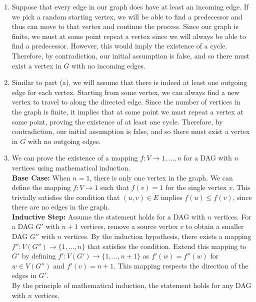 \documentclass{article}
\begin{document}
\begin{solution}
\begin{enumerate}[label = (\alph*)]
    \item Suppose that every edge in our graph does have at least an incoming edge. If we pick a random starting vertex, we will be able to find a predecessor and thus can move to that vertex and continue the process. Since our graph is finite, we must at some point repeat a vertex since we will always be able to find a predecessor. However, this would imply the existence of a cycle. Therefore, by contradiction, our initial assumption is false, and so there must exist a vertex in $G$ with no incoming edges.

    \item Similar to part (a), we will assume that there is indeed at least one outgoing edge for each vertex. Starting from some vertex, we can always find a new vertex to travel to along the directed edge. Since the number of vertices in the graph is finite, it implies that at some point we must repeat a vertex at some point, proving the existence of at least one cycle. Therefore, by contradiction, our initial assumption is false, and so there must exist a vertex in $G$ with no outgoing edges.

    \item We can prove the existence of a mapping $f : V \to {1, \dots, n}$ for a DAG with $n$ vertices using mathematical induction.\\
    
    \textbf{Base Case:} When $n = 1$, there is only one vertex in the graph. We can define the mapping $f : V \to {1}$ such that $f(v) = 1$ for the single vertex $v$. This trivially satisfies the condition that $(u, v) \in E$ implies $f(u) \leq f(v)$, since there are no edges in the graph.\\
    
    \textbf{Inductive Step:} Assume the statement holds for a DAG with $n$ vertices. For a DAG $G'$ with $n+1$ vertices, remove a source vertex $v$ to obtain a smaller DAG $G''$ with $n$ vertices. By the induction hypothesis, there exists a mapping $f'' : V(G'') \to \{1, \dots, n\}$ that satisfies the condition. Extend this mapping to $G'$ by defining $f' : V(G') \to \{1, \dots, n+1\}$ as $f'(w) = f''(w)$ for $w \in V(G'')$ and $f'(v) = n+1$. This mapping respects the direction of the edges in $G'$.\\
    
    By the principle of mathematical induction, the statement holds for any DAG with $n$ vertices.
\end{enumerate}
\end{solution}
\end{document}
